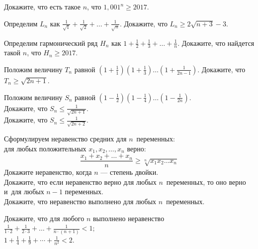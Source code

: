 



\begin{problems}

\item
Докажите, что есть такое $n$, что $1{,}001^{n} \geq 2017$.

\item
Определим $L_{n}$ как 
\(
    \frac{1}{\sqrt{1}} + \frac{1}{\sqrt{2}} + \ldots + \frac{1}{\sqrt{n}}
\).
Докажите, что $L_{n} \geq 2 \sqrt{n + 3} - 3$. 

\item
Определим гармонический ряд $H_{n}$ как 
\(
    1 + \frac{1}{2} + \frac{1}{3} + \ldots + \frac{1}{n}
\).
Докажите, что найдется такой $n$, что $H_{n} \geq 2017$.

\item
Положим величину $T_{n}$ равной
\(
    \left( 1 + \frac{1}{1} \right)
    \left( 1 + \frac{1}{3} \right)
    \ldots
    \left( 1 + \frac{1}{2n - 1} \right)
\).
Докажите, что $T_{n} \geq \sqrt{2 n + 1}$.

\item
Положим величину $S_{n}$ равной
\(
    \left( 1 - \frac{1}{2} \right)
    \left( 1 - \frac{1}{4} \right)
    \ldots
    \left( 1 - \frac{1}{2n} \right)
\).
\\
\subproblem
Докажите, что $S_{n} \leq \frac{1}{\sqrt{2 n + 1}}$.
\\
\subproblem
Докажите, что $S_{n} \leq \frac{1}{\sqrt{2 n + 2}}$.

\item
Сформулируем неравенство средних для $n$~переменных:\\
для любых положительных $x_1, x_2, \ldots, x_n$ верно:
\[
    \frac{x_{1} + x_{2} + \ldots + x_{n}}{n}
\geq
    \sqrt[n]{x_{1} x_{2} \ldots x_{n}}
\]
\subproblem
Докажите неравенство, когда $n$ --- степень двойки.
\\
\subproblem
Докажите, что если неравенство верно для любых $n$~переменных, то оно верно
и~для любых $n - 1$ переменных.
\\
\subproblem
Докажите, что неравенство выполнено для любых $n$~переменных.

\item
Докажите, что для любого $n$ выполнено неравенство
\\[0.5ex]
\subproblem
\( \displaystyle
    \frac{1}{1 \cdot 2} + \frac{1}{2 \cdot 3} + \ldots
    + \frac{1}{n \cdot (n + 1)}
<
    1
\);
\\[1.0ex]
\subproblem
\( \displaystyle
    1 + \frac{1}{4} + \frac{1}{9} + \cdots + \frac{1}{n^2}
<
    2
\).

\end{problems}

